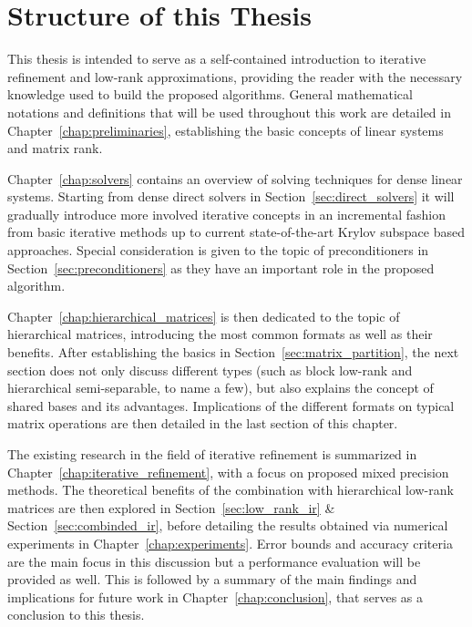 \section{Structure of this Thesis}
\label{sec:structure}

This thesis is intended to serve as a self-contained introduction to iterative refinement and low-rank approximations, providing the reader with the necessary knowledge used to build the proposed algorithms. General mathematical notations and definitions that will be used throughout this work are detailed in Chapter~\hyperref[chap:preliminaries]{\ref{chap:preliminaries}}, establishing the basic concepts of linear systems and matrix rank.

Chapter~\hyperref[chap:solvers]{\ref{chap:solvers}} contains an overview of solving techniques for dense linear systems. Starting from dense direct solvers in Section~\hyperref[sec:direct_solvers]{\ref{sec:direct_solvers}} it will gradually introduce more involved iterative concepts in an incremental fashion from basic iterative methods up to current state-of-the-art Krylov subspace based approaches. Special consideration is given to the topic of preconditioners in Section~\hyperref[sec:preconditioners]{\ref{sec:preconditioners}} as they have an important role in the proposed algorithm.

Chapter~\hyperref[chap:hierarchical_matrices]{\ref{chap:hierarchical_matrices}} is then dedicated to the topic of hierarchical matrices, introducing the most common formats as well as their benefits. After establishing the basics in Section~\hyperref[sec:matrix_partition]{\ref{sec:matrix_partition}}, the next section does not only discuss different types (such as block low-rank and hierarchical semi-separable, to name a few), but also explains the concept of shared bases and its advantages. Implications of the different formats on typical matrix operations are then detailed in the last section of this chapter. 

The existing research in the field of iterative refinement is summarized in Chapter~\hyperref[chap:iterative_refinement]{\ref{chap:iterative_refinement}}, with a focus on proposed mixed precision methods. The theoretical benefits of the combination with hierarchical low-rank matrices are then explored in Section~\hyperref[sec:low_rank_ir]{\ref{sec:low_rank_ir}} \& Section~\hyperref[sec:combinded_ir]{\ref{sec:combinded_ir}}, before detailing the results obtained via numerical experiments in Chapter~\hyperref[chap:experiments]{\ref{chap:experiments}}. Error bounds and accuracy criteria are the main focus in this discussion but a performance evaluation will be provided as well. This is followed by a summary of the main findings and implications for future work in Chapter~\hyperref[chap:conclusion]{\ref{chap:conclusion}}, that serves as a conclusion to this thesis.